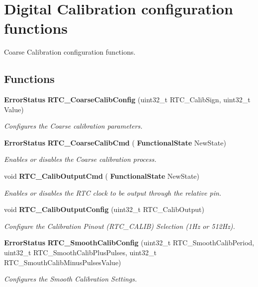 \section{Digital Calibration configuration functions}
\label{group__RTC__Group7}


Coarse Calibration configuration functions.  


\subsection*{Functions}
\begin{DoxyCompactItemize}
\item 
\textbf{ Error\+Status} \textbf{ R\+T\+C\+\_\+\+Coarse\+Calib\+Config} (uint32\+\_\+t R\+T\+C\+\_\+\+Calib\+Sign, uint32\+\_\+t Value)
\begin{DoxyCompactList}\small\item\em Configures the Coarse calibration parameters. \end{DoxyCompactList}\item 
\textbf{ Error\+Status} \textbf{ R\+T\+C\+\_\+\+Coarse\+Calib\+Cmd} (\textbf{ Functional\+State} New\+State)
\begin{DoxyCompactList}\small\item\em Enables or disables the Coarse calibration process. \end{DoxyCompactList}\item 
void \textbf{ R\+T\+C\+\_\+\+Calib\+Output\+Cmd} (\textbf{ Functional\+State} New\+State)
\begin{DoxyCompactList}\small\item\em Enables or disables the R\+TC clock to be output through the relative pin. \end{DoxyCompactList}\item 
void \textbf{ R\+T\+C\+\_\+\+Calib\+Output\+Config} (uint32\+\_\+t R\+T\+C\+\_\+\+Calib\+Output)
\begin{DoxyCompactList}\small\item\em Configure the Calibration Pinout (R\+T\+C\+\_\+\+C\+A\+L\+IB) Selection (1\+Hz or 512\+Hz). \end{DoxyCompactList}\item 
\textbf{ Error\+Status} \textbf{ R\+T\+C\+\_\+\+Smooth\+Calib\+Config} (uint32\+\_\+t R\+T\+C\+\_\+\+Smooth\+Calib\+Period, uint32\+\_\+t R\+T\+C\+\_\+\+Smooth\+Calib\+Plus\+Pulses, uint32\+\_\+t R\+T\+C\+\_\+\+Smouth\+Calib\+Minus\+Pulses\+Value)
\begin{DoxyCompactList}\small\item\em Configures the Smooth Calibration Settings. \end{DoxyCompactList}\end{DoxyCompactItemize}


